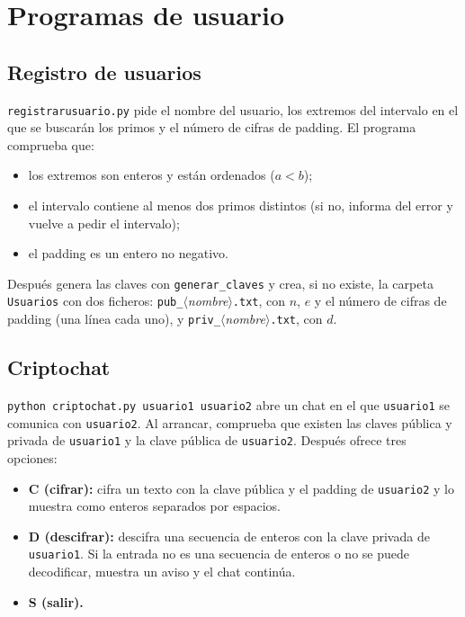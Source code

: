 \documentclass[11pt,a4paper]{article}
\newcommand{\code}[1]{\texttt{#1}}
\begin{document}
\section{Programas de usuario}

\subsection{Registro de usuarios}

\code{registrarusuario.py} pide el nombre del usuario, los extremos del intervalo en el que se buscarán los primos y el número de cifras de padding. El programa comprueba que:

\begin{itemize}
\item los extremos son enteros y están ordenados ($a<b$);
\item el intervalo contiene al menos dos primos distintos (si no, informa del error y vuelve a pedir el intervalo);
\item el padding es un entero no negativo.
\end{itemize}

Después genera las claves con \code{generar\_claves} y crea, si no existe, la carpeta \code{Usuarios} con dos ficheros: \code{pub\_}$\langle$\textit{nombre}$\rangle$\code{.txt}, con $n$, $e$ y el número de cifras de padding (una línea cada uno), y \code{priv\_}$\langle$\textit{nombre}$\rangle$\code{.txt}, con $d$.

\subsection{Criptochat}

\code{python criptochat.py usuario1 usuario2} abre un chat en el que \code{usuario1} se comunica con \code{usuario2}. Al arrancar, comprueba que existen las claves pública y privada de \code{usuario1} y la clave pública de \code{usuario2}. Después ofrece tres opciones:

\begin{itemize}
\item \textbf{C (cifrar):} cifra un texto con la clave pública y el padding de \code{usuario2} y lo muestra como enteros separados por espacios.
\item \textbf{D (descifrar):} descifra una secuencia de enteros con la clave privada de \code{usuario1}. Si la entrada no es una secuencia de enteros o no se puede decodificar, muestra un aviso y el chat continúa.
\item \textbf{S (salir).}
\end{itemize}
\end{document}
